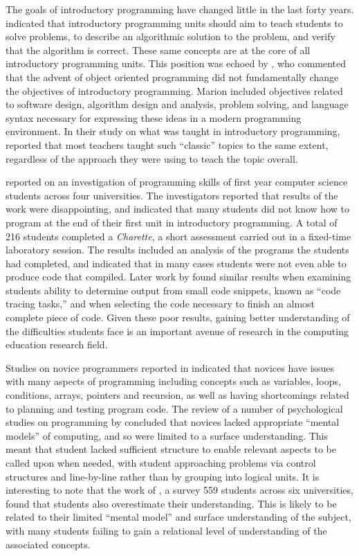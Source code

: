The goals of introductory programming have changed little in the last forty years. \citet{Gries:1974} indicated that introductory programming units should aim to teach students to solve problems, to describe an algorithmic solution to the problem, and verify that the algorithm is correct. These same concepts are at the core of all introductory programming units. This position was echoed by \citet{Marion:1999}, who commented that the advent of object oriented programming did not fundamentally change the objectives of introductory programming. Marion included objectives related to software design, algorithm design and analysis, problem solving, and language syntax necessary for expressing these ideas in a modern programming environment. In their study on what was taught in introductory programming, \citet{Schulte:2006} reported that most teachers taught such ``classic'' topics to the same extent, regardless of the approach they were using to teach the topic overall.

\citet{McCracken:2001} reported on an investigation of programming skills of first year computer science students across four universities. The investigators reported that results of the work were disappointing, and indicated that many students did not know how to program at the end of their first unit in introductory programming. A total of 216 students completed a \emph{Charette}, a short assessment carried out in a fixed-time laboratory session. The results included an analysis of the programs the students had completed, and indicated that in many cases students were not even able to produce code that compiled. Later work by \citet{Lister:2004} found similar results when examining students ability to determine output from small code snippets, known as ``code tracing tasks,'' and when selecting the code necessary to finish an almost complete piece of code. Given these poor results, gaining better understanding of the difficulties students face is an important avenue of research in the computing education research field.

Studies on novice programmers reported in \citet{Soloway:1988} indicated that novices have issues with many aspects of programming including concepts such as variables, loops, conditions, arrays, pointers and recursion, as well as having shortcomings related to planning and testing program code. The review of a number of psychological studies on programming by \citet{Winslow:1996} concluded that novices lacked appropriate ``mental models'' of computing, and so were limited to a surface understanding. This meant that student lacked sufficient structure to enable relevant aspects to be called upon when needed, with student approaching problems via control structures and line-by-line rather than by grouping into logical units. It is interesting to note that the work of \citet{Lahtinen:2005}, a survey 559 students across six universities, found that students also overestimate their understanding. This is likely to be related to their limited ``mental model'' and surface understanding of the subject, with many students failing to gain a relational level of understanding of the associated concepts. 

